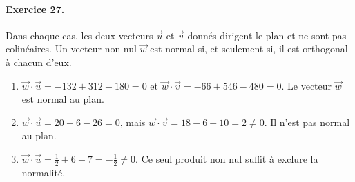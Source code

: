 \paragraph{Exercice 27.} Dans chaque cas, les deux vecteurs $\vec u$ et $\vec v$ donnés dirigent le plan et ne sont pas colinéaires. Un vecteur non nul $\vec w$ est normal si, et seulement si, il est orthogonal à chacun d'eux.
\begin{enumerate}
\item $\vec w\cdot\vec u=-132+312-180=0$ et $\vec w\cdot\vec v=-66+546-480=0$. Le vecteur $\vec w$ est normal au plan.
\item $\vec w\cdot\vec u=20+6-26=0$, mais $\vec w\cdot\vec v=18-6-10=2\ne0$. Il n'est pas normal au plan.
\item $\vec w\cdot\vec u=\frac12+6-7=-\frac12\ne0$. Ce seul produit non nul suffit à exclure la normalité.
\end{enumerate}

\fi

